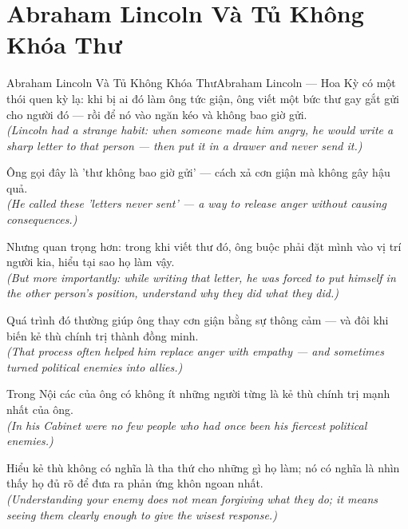 \section{Abraham Lincoln Và Tủ Không Khóa Thư}
\begin{truyen}{Abraham Lincoln Và Tủ Không Khóa Thư}{Abraham Lincoln --- Hoa Kỳ}
 có một thói quen kỳ lạ: khi bị ai đó làm ông tức giận, ông viết một bức thư gay gắt gửi cho người đó --- rồi để nó vào ngăn kéo và không bao giờ gửi.\\[4pt]
\textit{(Lincoln had a strange habit: when someone made him angry, he would write a sharp letter to that person --- then put it in a drawer and never send it.)}

Ông gọi đây là 'thư không bao giờ gửi' --- cách xả cơn giận mà không gây hậu quả.\\[4pt]
\textit{(He called these 'letters never sent' --- a way to release anger without causing consequences.)}

Nhưng quan trọng hơn: trong khi viết thư đó, ông buộc phải đặt mình vào vị trí người kia, hiểu tại sao họ làm vậy.\\[4pt]
\textit{(But more importantly: while writing that letter, he was forced to put himself in the other person's position, understand why they did what they did.)}

Quá trình đó thường giúp ông thay cơn giận bằng sự thông cảm --- và đôi khi biến kẻ thù chính trị thành đồng minh.\\[4pt]
\textit{(That process often helped him replace anger with empathy --- and sometimes turned political enemies into allies.)}

Trong Nội các của ông có không ít những người từng là kẻ thù chính trị mạnh nhất của ông.\\[4pt]
\textit{(In his Cabinet were no few people who had once been his fiercest political enemies.)}

\end{truyen}
\begin{baihoc}
  Hiểu kẻ thù không có nghĩa là tha thứ cho những gì họ làm; nó có nghĩa là nhìn thấy họ đủ rõ để đưa ra phản ứng khôn ngoan nhất.\\[4pt]
  \textit{(Understanding your enemy does not mean forgiving what they do; it means seeing them clearly enough to give the wisest response.)}
\end{baihoc}

